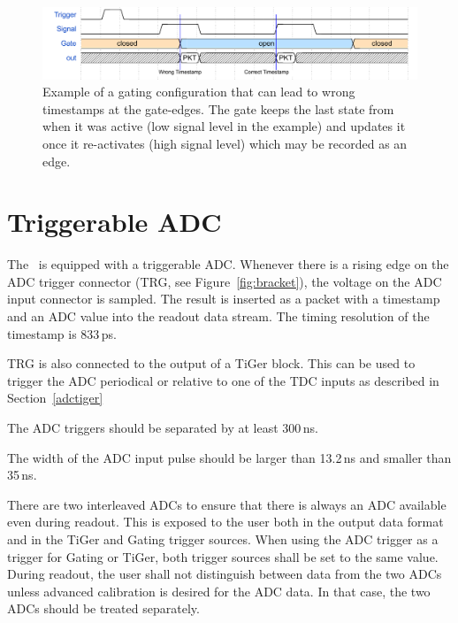 {    \begin{figure}[tbh]
        \centering
        \includegraphics[width=1.0\linewidth]{figures/gating_caveat.pdf}
        \caption{Example of a gating configuration that can lead to wrong
            timestamps at the gate-edges. 
            The gate keeps the last state from when it was active (low signal
            level in the example) and updates it once it re-activates 
            (high signal level) which may be recorded as an edge.}
        \label{fig:gatingcaviat}
    \end{figure}

        
    \section{Triggerable ADC}
    \label{adc}
    The \deviceName\ is equipped with a triggerable ADC.  Whenever there is a
    rising edge on the ADC trigger connector (TRG, see
    Figure~\ref{fig:bracket}), the voltage on the ADC input connector is
    sampled. The result is inserted as a packet with a timestamp and an ADC
    value into the readout data stream. The timing resolution of the timestamp
	is 833\,ps.

    TRG is also connected to the output of a TiGer block.  This
    can be used  to trigger the ADC periodical or relative to one of the TDC
    inputs as described in Section~\ref{adctiger}

    The ADC triggers should be separated by at least 300\,ns.

    The width of the ADC input pulse should be larger than 13.2\,ns and
    smaller than 35\,ns.

    There are two interleaved ADCs to ensure that there is always an ADC
    available even during readout. This is exposed to the user both in the
    output data format and in the TiGer and Gating trigger sources.  When
    using the ADC trigger as a trigger for Gating or TiGer, both trigger
    sources shall be set to the same value.  During readout, the user shall
    not distinguish between data from the two ADCs unless advanced calibration
    is desired for the ADC data. In that case, the two ADCs should be treated
    separately.   
}{}